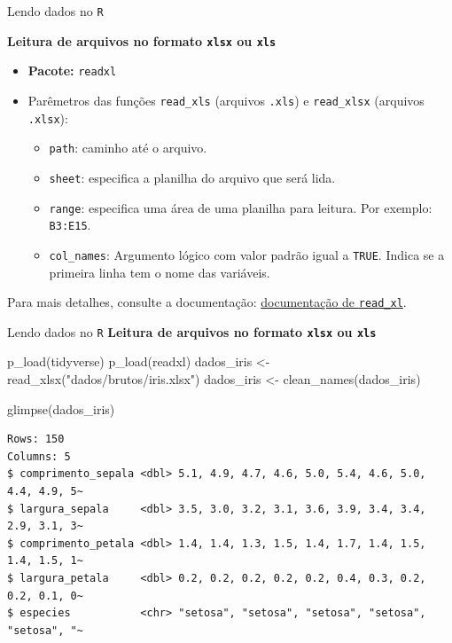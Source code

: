 \documentclass[
  10pt,
  ignorenonframetext,
]{beamer}
\newenvironment{Shaded}{\begin{snugshade}}{\end{snugshade}}
\newcommand{\FunctionTok}[1]{\textcolor[rgb]{0.28,0.35,0.67}{#1}}
\newcommand{\NormalTok}[1]{\textcolor[rgb]{0.00,0.23,0.31}{#1}}
\newcommand{\OtherTok}[1]{\textcolor[rgb]{0.00,0.23,0.31}{#1}}
\newcommand{\StringTok}[1]{\textcolor[rgb]{0.13,0.47,0.30}{#1}}
\providecommand{\tightlist}{%
  \setlength{\itemsep}{0pt}\setlength{\parskip}{0pt}}\usepackage{longtable,booktabs,array}
\begin{document}
\begin{frame}[fragile]{Lendo dados no \texttt{R}}
\protect\hypertarget{lendo-dados-no-r}{}
\normalsize

\textbf{Leitura de arquivos no formato \texttt{xlsx} ou \texttt{xls}}

\begin{itemize}
\tightlist
\item
  \textbf{Pacote:} \texttt{readxl}
\item
  Parêmetros das funções \texttt{read\_xls} (arquivos \texttt{.xls}) e
  \texttt{read\_xlsx} (arquivos \texttt{.xlsx}):

  \begin{itemize}
  \tightlist
  \item
    \texttt{path}: caminho até o arquivo.
  \item
    \texttt{sheet}: especifica a planilha do arquivo que será lida.
  \item
    \texttt{range}: especifica uma área de uma planilha para leitura.
    Por exemplo: \texttt{B3:E15}.
  \item
    \texttt{col\_names}: Argumento lógico com valor padrão igual a
    \texttt{TRUE}. Indica se a primeira linha tem o nome das variáveis.
  \end{itemize}
\end{itemize}

Para mais detalhes, consulte a documentação:
\href{https://readxl.tidyverse.org}{documentação de \texttt{read\_xl}}.
\end{frame}

\begin{frame}[fragile]{Lendo dados no \texttt{R}}
\protect\hypertarget{lendo-dados-no-r-1}{}
\textbf{Leitura de arquivos no formato \texttt{xlsx} ou \texttt{xls}}

\small

\begin{Shaded}
\begin{Highlighting}[]
\FunctionTok{p\_load}\NormalTok{(tidyverse)}
\FunctionTok{p\_load}\NormalTok{(readxl)}
\NormalTok{dados\_iris }\OtherTok{\textless{}{-}} \FunctionTok{read\_xlsx}\NormalTok{(}\StringTok{"dados/brutos/iris.xlsx"}\NormalTok{)}
\NormalTok{dados\_iris }\OtherTok{\textless{}{-}} \FunctionTok{clean\_names}\NormalTok{(dados\_iris)}

\FunctionTok{glimpse}\NormalTok{(dados\_iris)}
\end{Highlighting}
\end{Shaded}

\begin{verbatim}
Rows: 150
Columns: 5
$ comprimento_sepala <dbl> 5.1, 4.9, 4.7, 4.6, 5.0, 5.4, 4.6, 5.0, 4.4, 4.9, 5~
$ largura_sepala     <dbl> 3.5, 3.0, 3.2, 3.1, 3.6, 3.9, 3.4, 3.4, 2.9, 3.1, 3~
$ comprimento_petala <dbl> 1.4, 1.4, 1.3, 1.5, 1.4, 1.7, 1.4, 1.5, 1.4, 1.5, 1~
$ largura_petala     <dbl> 0.2, 0.2, 0.2, 0.2, 0.2, 0.4, 0.3, 0.2, 0.2, 0.1, 0~
$ especies           <chr> "setosa", "setosa", "setosa", "setosa", "setosa", "~
\end{verbatim}

\normalsize
\end{frame}
\end{document}
